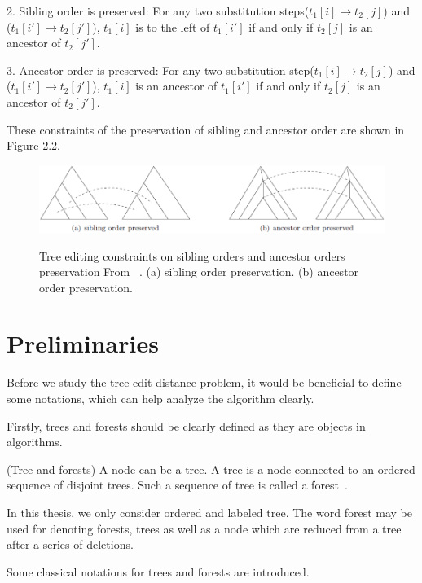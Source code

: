 2. Sibling order is preserved: For any two substitution steps($t_1[i] \to t_2[j]$) and ($t_1[i'] \to t_2[j']$), $t_1[i]$ is to the left of $t_1[i']$ if and only if $t_2[j]$ is an ancestor of $t_2[j']$.

3. Ancestor order is preserved: For any two substitution step($t_1[i] \to t_2[j]$) and ($t_1[i'] \to t_2[j']$), $t_1[i]$ is an ancestor of $t_1[i']$ if and only if $t_2[j]$ is an ancestor of $t_2[j']$.

These constraints of the preservation of sibling and ancestor order are shown in Figure 2.2.

\begin{figure}
		\centering
		\includegraphics[width=14cm,clip]{Figures/TreeEditingOperationConstraint}
		\label{Sibling orders and ancestor orders preservation} 
		\caption{Tree editing constraints on sibling orders and ancestor orders preservation From ~\cite{chen2015review}. (a) sibling order preservation. (b) ancestor order preservation.}
\end{figure}

\section{Preliminaries}
Before we study the tree edit distance problem, it would be beneficial to define some notations, which can help analyze the algorithm clearly. 

Firstly, trees and forests should be clearly defined as they are objects in algorithms. 

\begin{definition}
(Tree and forests)
A node can be a tree. A tree is a node connected to an ordered sequence of disjoint trees. Such a sequence of tree is called a forest~\cite{dulucq2005decomposition}. 
\end{definition}

In this thesis, we only consider ordered and labeled tree. The word forest may be used for denoting forests, trees as well as a node which are reduced from a tree after a series of deletions. 

Some classical notations for trees and forests are introduced.  

